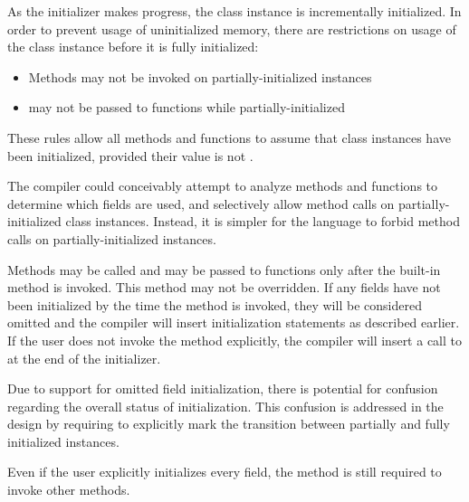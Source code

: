As the initializer makes progress, the class instance is incrementally
initialized. In order to prevent usage of uninitialized memory, there are
restrictions on usage of the class instance before it is fully initialized:

\begin{itemize}
\item Methods may not be invoked on partially-initialized instances
\item {} may not be passed to functions while partially-initialized
\end{itemize}

These rules allow all methods and functions to assume that class instances
have been initialized, provided their value is not .

\begin{rationale}
  The compiler could conceivably attempt to analyze methods and functions to
  determine which fields are used, and selectively allow method calls on
  partially-initialized class instances. Instead, it is simpler for the
  language to forbid method calls on partially-initialized instances.
\end{rationale}

Methods may be called and  may be passed to functions only after the
built-in  method is invoked. This method may not be overridden.
If any fields have not been initialized by the time the  method
is invoked, they will be considered omitted and the compiler will insert
initialization statements as described earlier. If the user does not invoke the
 method explicitly, the compiler will insert a call to
 at the end of the initializer.

\begin{rationale}
Due to support for omitted field initialization, there is potential for
confusion regarding the overall status of initialization. This confusion is
addressed in the design by requiring  to explicitly mark the
transition between partially and fully initialized instances.
\end{rationale}

\begin{note}
Even if the user explicitly initializes every field, the  method
is still required to invoke other methods.
\end{note}

